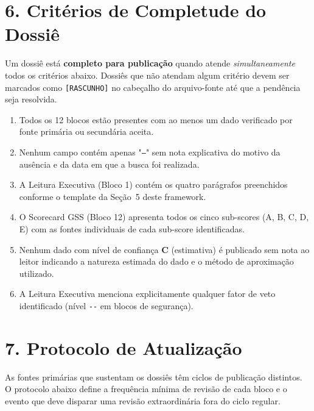 \section*{6. Critérios de Completude do Dossiê}

Um dossiê está \textbf{completo para publicação} quando atende \textit{simultaneamente} todos os critérios abaixo. Dossiês que não atendam algum critério devem ser marcados como \texttt{[RASCUNHO]} no cabeçalho do arquivo-fonte até que a pendência seja resolvida.

\begin{enumerate}
  \item Todos os 12 blocos estão presentes com ao menos um dado verificado por fonte primária ou secundária aceita.
  \item Nenhum campo contém apenas "\texttt{---}" sem nota explicativa do motivo da ausência e da data em que a busca foi realizada.
  \item A Leitura Executiva (Bloco 1) contém os quatro parágrafos preenchidos conforme o template da Seção~5 deste framework.
  \item O Scorecard GSS (Bloco 12) apresenta todos os cinco sub-scores (A, B, C, D, E) com as fontes individuais de cada sub-score identificadas.
  \item Nenhum dado com nível de confiança \textbf{C} (estimativa) é publicado sem nota ao leitor indicando a natureza estimada do dado e o método de aproximação utilizado.
  \item A Leitura Executiva menciona explicitamente qualquer fator de veto identificado (nível \texttt{-{}-} em blocos de segurança).
\end{enumerate}

\section*{7. Protocolo de Atualização}

As fontes primárias que sustentam os dossiês têm ciclos de publicação distintos. O protocolo abaixo define a frequência mínima de revisão de cada bloco e o evento que deve disparar uma revisão extraordinária fora do ciclo regular.

\bigskip

